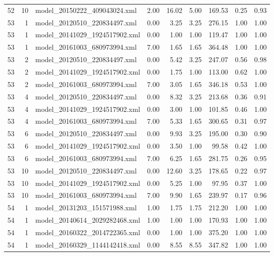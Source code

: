 \begin{table}[ht]
\begin{tabular}{rrlrrrrrr}
   52 &  10 & model\_20150222\_409043024.xml & 2.00 & 16.02 & 5.00 & 169.53 & 0.25 & 0.93 \\ 
   53 &   1 & model\_20120510\_220834497.xml & 0.00 & 3.25 & 3.25 & 276.15 & 1.00 & 1.00 \\ 
   53 &   1 & model\_20141029\_1924517902.xml & 0.00 & 1.00 & 1.00 & 119.47 & 1.00 & 1.00 \\ 
   53 &   1 & model\_20161003\_680973994.xml & 7.00 & 1.65 & 1.65 & 364.48 & 1.00 & 1.00 \\ 
   53 &   2 & model\_20120510\_220834497.xml & 0.00 & 5.42 & 3.25 & 247.07 & 0.56 & 0.98 \\ 
   53 &   2 & model\_20141029\_1924517902.xml & 0.00 & 1.75 & 1.00 & 113.00 & 0.62 & 1.00 \\ 
   53 &   2 & model\_20161003\_680973994.xml & 7.00 & 3.05 & 1.65 & 346.18 & 0.53 & 1.00 \\ 
   53 &   4 & model\_20120510\_220834497.xml & 0.00 & 8.32 & 3.25 & 213.68 & 0.36 & 0.91 \\ 
   53 &   4 & model\_20141029\_1924517902.xml & 0.00 & 3.00 & 1.00 & 101.85 & 0.46 & 1.00 \\ 
   53 &   4 & model\_20161003\_680973994.xml & 7.00 & 5.33 & 1.65 & 300.65 & 0.31 & 0.97 \\ 
   53 &   6 & model\_20120510\_220834497.xml & 0.00 & 9.93 & 3.25 & 195.00 & 0.30 & 0.90 \\ 
   53 &   6 & model\_20141029\_1924517902.xml & 0.00 & 3.50 & 1.00 & 99.58 & 0.42 & 1.00 \\ 
   53 &   6 & model\_20161003\_680973994.xml & 7.00 & 6.25 & 1.65 & 281.75 & 0.26 & 0.95 \\ 
   53 &  10 & model\_20120510\_220834497.xml & 0.00 & 12.60 & 3.25 & 178.65 & 0.22 & 0.97 \\ 
   53 &  10 & model\_20141029\_1924517902.xml & 0.00 & 5.25 & 1.00 & 97.95 & 0.37 & 1.00 \\ 
   53 &  10 & model\_20161003\_680973994.xml & 7.00 & 9.90 & 1.65 & 239.97 & 0.17 & 0.96 \\ 
   54 &   1 & model\_20131203\_151571988.xml & 1.00 & 1.75 & 1.75 & 212.20 & 1.00 & 1.00 \\ 
   54 &   1 & model\_20140614\_2029282468.xml & 1.00 & 1.00 & 1.00 & 170.93 & 1.00 & 1.00 \\ 
   54 &   1 & model\_20160322\_2014722365.xml & 0.00 & 1.00 & 1.00 & 375.20 & 1.00 & 1.00 \\ 
   54 &   1 & model\_20160329\_1144142418.xml & 0.00 & 8.55 & 8.55 & 347.82 & 1.00 & 1.00 \\ 

\end{tabular}
\end{table}
